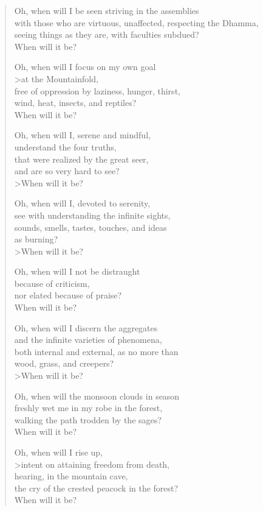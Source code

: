 \documentclass[12pt,openany]{book}%
\begin{document}
\begin{verse}
Oh, when will I be seen striving in the assemblies \\
with those who are virtuous, unaffected, respecting the Dhamma, \\
seeing things as they are, with faculties subdued? \\
When will it be? 

Oh, when will I focus on my own goal \\>at the Mountainfold, \\
free of oppression by laziness, hunger, thirst, \\
wind, heat, insects, and reptiles? \\
When will it be? 

Oh, when will I, serene and mindful, \\
understand the four truths, \\
that were realized by the great seer, \\
and are so very hard to see? \\>When will it be? 

Oh, when will I, devoted to serenity, \\
see with understanding the infinite sights, \\
sounds, smells, tastes, touches, and ideas \\
as burning? \\>When will it be? 

Oh, when will I not be distraught \\
because of criticism, \\
nor elated because of praise? \\
When will it be? 

Oh, when will I discern the aggregates \\
and the infinite varieties of phenomena, \\
both internal and external, as no more than \\
wood, grass, and creepers? \\>When will it be? 

Oh, when will the monsoon clouds in season \\
freshly wet me in my robe in the forest, \\
walking the path trodden by the sages? \\
When will it be? 

Oh, when will I rise up, \\>intent on attaining freedom from death, \\
hearing, in the mountain cave, \\
the cry of the crested peacock in the forest? \\
When will it be? 


\end{verse}
\end{document}
